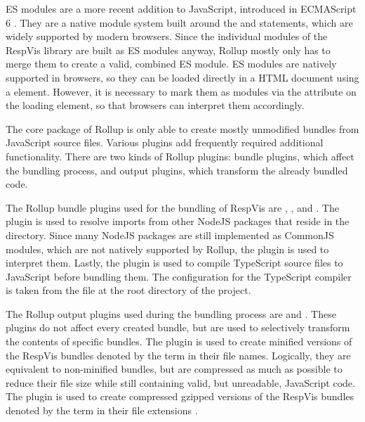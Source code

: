 ES modules are a more recent addition to JavaScript, introduced in
ECMAScript 6 \parencite{ECMAScript6}. They are a native module system
built around the  and  statements, which are
widely supported by modern browsers. Since the individual modules of
the RespVis library are built as ES modules anyway, Rollup mostly only
has to merge them to create a valid, combined ES module. ES modules
are natively supported in browsers, so they can be loaded directly in
a HTML document using a  element. However, it is
necessary to mark them as modules via the 
attribute on the loading  element, so that browsers can
interpret them accordingly.


The core package of Rollup is only able to create mostly unmodified
bundles from JavaScript source files. Various plugins add
frequently required additional functionality. There are two kinds of
Rollup plugins: bundle plugins, which affect the bundling process, and
output plugins, which transform the already bundled code.

The Rollup bundle plugins used for the bundling of RespVis are
, ,
and . The
 plugin is used to resolve imports
from other NodeJS packages that reside in the 
directory. Since many NodeJS packages are still implemented as
CommonJS modules, which are not natively supported by Rollup, the
 plugin is used to interpret them.
Lastly, the  plugin is used to compile
TypeScript source files to JavaScript before bundling them. The
configuration for the TypeScript compiler is taken from the
 file at the root directory of the project.

The Rollup output plugins used during the bundling process are
 and .  These
plugins do not affect every created bundle, but are used to
selectively transform the contents of specific bundles. The
 plugin is used to create minified versions
of the RespVis bundles denoted by the term  in their file
names. Logically, they are equivalent to non-minified bundles, but are
compressed as much as possible to reduce their file size while still
containing valid, but unreadable, JavaScript code. The
 plugin is used to create compressed gzipped
versions of the RespVis bundles denoted by the term  in
their file extensions \parencite{GZIP}.

